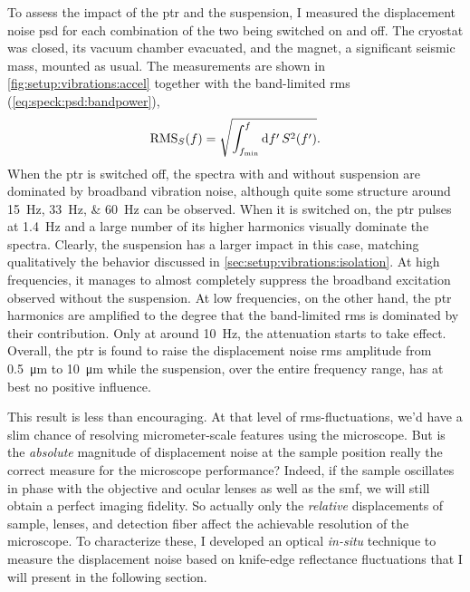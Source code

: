 To assess the impact of the \gls{ptr} and the suspension, I measured the displacement noise \gls{psd} for each combination of the two being switched on and off.
The cryostat was closed, its vacuum chamber evacuated, and the magnet, a significant seismic mass, mounted as usual.
The measurements are shown in \cref{fig:setup:vibrations:accel} together with the band-limited \gls{rms} (\cf \cref{eq:speck:psd:bandpower}),
\begin{equation}\label{eq:setup:vibrations:rms}
    \operatorname{RMS}_S(f) = \sqrt{\int_{f_{\mathrm{min}}}^{f}\dd{f^\prime}S^2(f^\prime)}.
\end{equation}
When the \gls{ptr} is switched off, the spectra with and without suspension are dominated by broadband vibration noise, although quite some structure around \qtylist{15;33;60}{\hertz} can be observed.
When it is switched on, the \gls{ptr} pulses at \qty{1.4}{\hertz} and a large number of its higher harmonics visually dominate the spectra.
Clearly, the suspension has a larger impact in this case, matching qualitatively the behavior discussed in \cref{sec:setup:vibrations:isolation}.
At high frequencies, it manages to almost completely suppress the broadband excitation observed without the suspension.
At low frequencies, on the other hand, the \gls{ptr} harmonics are amplified to the degree that the band-limited \gls{rms} is dominated by their contribution.
Only at around \qty{10}{\hertz}, the attenuation starts to take effect.
Overall, the \gls{ptr} is found to raise the displacement noise \gls{rms} amplitude from \qty{0.5}{\micro\meter} to \qty{10}{\micro\meter} while the suspension, over the entire frequency range, has at best no positive influence.

This result is less than encouraging.
At that level of \gls{rms}-fluctuations, we'd have a slim chance of resolving micrometer-scale features using the microscope.
But is the \emph{absolute} magnitude of displacement noise at the sample position really the correct measure for the microscope performance?
Indeed, if the sample oscillates in phase with the objective and ocular lenses as well as the \gls{smf}, we will still obtain a perfect imaging fidelity.
So actually only the \emph{relative} displacements of sample, lenses, and detection fiber affect the achievable resolution of the microscope.
To characterize these, I developed an optical \emph{in-situ} technique to measure the displacement noise based on knife-edge reflectance fluctuations that I will present in the following section.

